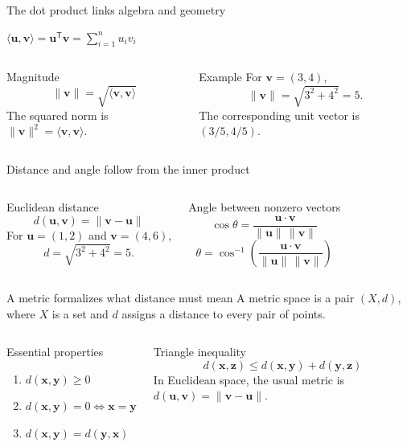 \documentclass[aspectratio=169,11pt]{beamer}
\newcommand{\keyeq}[1]{%
  \begin{center}
  \setlength{\fboxsep}{9pt}%
  {\color{navy}$\displaystyle #1$}
  \end{center}}
\begin{document}
\begin{frame}{The dot product links algebra and geometry}
\keyeq{\langle\bm u,\bm v\rangle=\bm u^{\mathsf T}\bm v=\sum_{i=1}^{n}u_iv_i}
\begin{columns}[T,onlytextwidth]
\begin{block}{Magnitude}
\[
\|\bm v\|=\sqrt{\langle\bm v,\bm v\rangle}
\]
The squared norm is $\|\bm v\|^2=\langle\bm v,\bm v\rangle$.
\end{block}
\begin{exampleblock}{Example}
For $\bm v=(3,4)$,
\[
\|\bm v\|=\sqrt{3^2+4^2}=5.
\]
The corresponding unit vector is $(3/5,4/5)$.
\end{exampleblock}
\end{columns}
\end{frame}

\begin{frame}{Distance and angle follow from the inner product}
\begin{columns}[T,onlytextwidth]
\begin{block}{Euclidean distance}
\[
d(\bm u,\bm v)=\|\bm v-\bm u\|
\]
For $\bm u=(1,2)$ and $\bm v=(4,6)$,
\[
d=\sqrt{3^2+4^2}=5.
\]
\end{block}
\begin{exampleblock}{Angle between nonzero vectors}
\[
\cos\theta=\frac{\bm u\cdot\bm v}{\|\bm u\|\,\|\bm v\|}
\]
\[
\theta=\cos^{-1}\!\left(\frac{\bm u\cdot\bm v}{\|\bm u\|\,\|\bm v\|}\right)
\]
\end{exampleblock}
\end{columns}
\end{frame}

\begin{frame}{A metric formalizes what distance must mean}
A metric space is a pair $(X,d)$, where $X$ is a set and $d$ assigns a distance to every pair of points.
\begin{columns}[T,onlytextwidth]
\begin{block}{Essential properties}
\begin{enumerate}
  \item $d(\bm x,\bm y)\ge 0$
  \item $d(\bm x,\bm y)=0\iff\bm x=\bm y$
  \item $d(\bm x,\bm y)=d(\bm y,\bm x)$
\end{enumerate}
\end{block}
\begin{exampleblock}{Triangle inequality}
\[
d(\bm x,\bm z)\le d(\bm x,\bm y)+d(\bm y,\bm z)
\]
In Euclidean space, the usual metric is $d(\bm u,\bm v)=\|\bm v-\bm u\|$.
\end{exampleblock}
\end{columns}
\end{frame}
\end{document}
